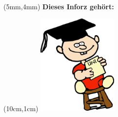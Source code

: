\thispagestyle{empty}

\begin{textblock*}{10cm}(5mm,4mm)
\normalsize \textbf{Dieses Inforz gehört:}
\end{textblock*}

\begin{textblock*}{4cm}(10cm,1cm)
\includegraphics[width=4cm]{../grafik/wesen/wesen_uni}
\end{textblock*}
